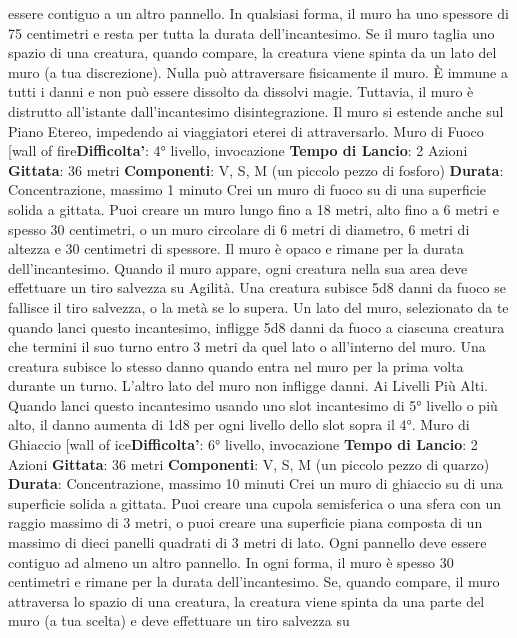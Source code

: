 \begin{multicols}{2}
essere contiguo a un altro pannello. In qualsiasi forma,
il muro ha uno spessore di 75 centimetri e resta per
tutta la durata dell’incantesimo. Se il muro taglia uno
spazio di una creatura, quando compare, la creatura
viene spinta da un lato del muro (a tua discrezione).
Nulla può attraversare fisicamente il muro. È immune a
tutti i danni e non può essere dissolto da dissolvi magie.
Tuttavia, il muro è distrutto all’istante dall’incantesimo
disintegrazione. Il muro si estende anche sul Piano
Etereo, impedendo ai viaggiatori eterei di attraversarlo.
Muro di Fuoco
[wall of fire\textbf{Difficolta'}:
4° livello, invocazione
\textbf{Tempo di Lancio}: 2 Azioni
\textbf{Gittata}: 36 metri
\textbf{Componenti}: V, S, M (un piccolo pezzo di fosforo)
\textbf{Durata}: Concentrazione, massimo 1 minuto
Crei un muro di fuoco su di una superficie solida a
gittata. Puoi creare un muro lungo fino a 18 metri, alto
fino a 6 metri e spesso 30 centimetri, o un muro
circolare di 6 metri di diametro, 6 metri di altezza e 30
centimetri di spessore. Il muro è opaco e rimane per la
durata dell’incantesimo.
Quando il muro appare, ogni creatura nella sua area
deve effettuare un tiro salvezza su Agilità. Una
creatura subisce 5d8 danni da fuoco se fallisce il tiro
salvezza, o la metà se lo supera.
Un lato del muro, selezionato da te quando lanci questo
incantesimo, infligge 5d8 danni da fuoco a ciascuna
creatura che termini il suo turno entro 3 metri da quel
lato o all’interno del muro. Una creatura subisce lo
stesso danno quando entra nel muro per la prima volta
durante un turno. L’altro lato del muro non infligge
danni.
Ai Livelli Più Alti. Quando lanci questo incantesimo
usando uno slot incantesimo di 5° livello o più alto, il
danno aumenta di 1d8 per ogni livello dello slot sopra il
4°.
Muro di Ghiaccio
[wall of ice\textbf{Difficolta'}:
6° livello, invocazione
\textbf{Tempo di Lancio}: 2 Azioni
\textbf{Gittata}: 36 metri
\textbf{Componenti}: V, S, M (un piccolo pezzo di quarzo)
\textbf{Durata}: Concentrazione, massimo 10 minuti
Crei un muro di ghiaccio su di una superficie solida a
gittata. Puoi creare una cupola semisferica o una sfera
con un raggio massimo di 3 metri, o puoi creare una
superficie piana composta di un massimo di dieci
panelli quadrati di 3 metri di lato. Ogni pannello deve
essere contiguo ad almeno un altro pannello. In ogni
forma, il muro è spesso 30 centimetri e rimane per la
durata dell’incantesimo.
Se, quando compare, il muro attraversa lo spazio di una
creatura, la creatura viene spinta da una parte del muro
(a tua scelta) e deve effettuare un tiro salvezza su

\end{multicols}
